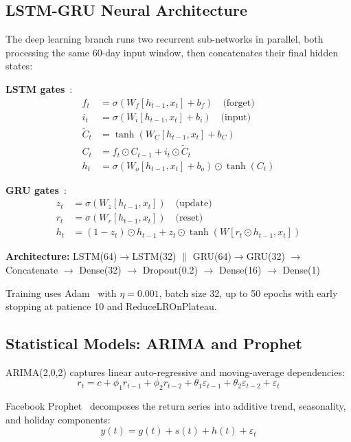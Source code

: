 \documentclass[10pt,a4paper,twoside]{article}
\begin{document}
\subsection{LSTM-GRU Neural Architecture}

The deep learning branch runs two recurrent sub-networks in parallel, both
processing the same 60-day input window, then concatenates their final hidden
states:

\textbf{LSTM gates}~\cite{hochreiter1997}:
\begin{align}
  f_t &= \sigma(W_f [h_{t-1}, x_t] + b_f) \quad\text{(forget)} \\
  i_t &= \sigma(W_i [h_{t-1}, x_t] + b_i) \quad\text{(input)} \\
  \tilde{C}_t &= \tanh(W_C [h_{t-1}, x_t] + b_C) \\
  C_t &= f_t \odot C_{t-1} + i_t \odot \tilde{C}_t \\
  h_t &= \sigma(W_o [h_{t-1}, x_t] + b_o) \odot \tanh(C_t)
\end{align}

\textbf{GRU gates}~\cite{cho2014}:
\begin{align}
  z_t &= \sigma(W_z [h_{t-1}, x_t]) \quad\text{(update)} \\
  r_t &= \sigma(W_r [h_{t-1}, x_t]) \quad\text{(reset)} \\
  h_t &= (1-z_t) \odot h_{t-1} + z_t \odot \tanh(W[r_t \odot h_{t-1}, x_t])
\end{align}

\textbf{Architecture:}
LSTM(64)$\to$LSTM(32) $\|$ GRU(64)$\to$GRU(32) $\to$ Concatenate $\to$ Dense(32) $\to$ Dropout(0.2) $\to$ Dense(16) $\to$ Dense(1)

Training uses Adam~\cite{kingma2015} with $\eta = 0.001$, batch size 32, up to 50 epochs with
early stopping at patience 10 and ReduceLROnPlateau.

\subsection{Statistical Models: ARIMA and Prophet}

ARIMA(2,0,2) captures linear auto-regressive and moving-average dependencies:
\begin{equation}
  r_t = c + \phi_1 r_{t-1} + \phi_2 r_{t-2}
          + \theta_1 \varepsilon_{t-1} + \theta_2 \varepsilon_{t-2} + \varepsilon_t
\end{equation}

Facebook Prophet~\cite{taylor2018} decomposes the return series into additive
trend, seasonality, and holiday components:
\begin{equation}
  y(t) = g(t) + s(t) + h(t) + \varepsilon_t
\end{equation}
\end{document}
